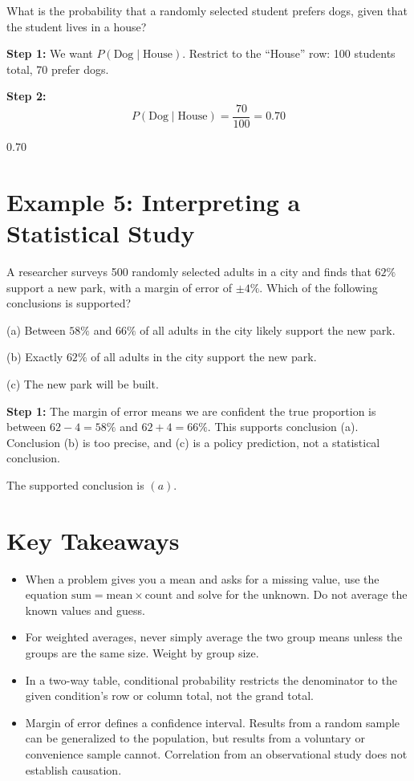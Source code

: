 \documentclass[14pt]{extarticle}
\begin{document}
What is the probability that a randomly selected student prefers dogs, given that the student lives in a house?

\textbf{Step 1:} We want \(P(\text{Dog} \mid \text{House})\). Restrict to the ``House'' row: 100 students total, 70 prefer dogs.

\textbf{Step 2:}
\[
P(\text{Dog} \mid \text{House}) = \frac{70}{100} = 0.70
\]

\(\boxed{0.70}\)

\section*{Example 5: Interpreting a Statistical Study}

A researcher surveys 500 randomly selected adults in a city and finds that \(62\%\) support a new park, with a margin of error of \(\pm 4\%\). Which of the following conclusions is supported?

(a) Between \(58\%\) and \(66\%\) of all adults in the city likely support the new park.

(b) Exactly \(62\%\) of all adults in the city support the new park.

(c) The new park will be built.

\textbf{Step 1:} The margin of error means we are confident the true proportion is between \(62 - 4 = 58\%\) and \(62 + 4 = 66\%\). This supports conclusion (a). Conclusion (b) is too precise, and (c) is a policy prediction, not a statistical conclusion.

The supported conclusion is \(\boxed{(a)}\).

\section*{Key Takeaways}
\begin{itemize}
  \item When a problem gives you a mean and asks for a missing value, use the equation \(\text{sum} = \text{mean} \times \text{count}\) and solve for the unknown. Do not average the known values and guess.
  \item For weighted averages, never simply average the two group means unless the groups are the same size. Weight by group size.
  \item In a two-way table, conditional probability restricts the denominator to the given condition's row or column total, not the grand total.
  \item Margin of error defines a confidence interval. Results from a random sample can be generalized to the population, but results from a voluntary or convenience sample cannot. Correlation from an observational study does not establish causation.
\end{itemize}
\end{document}
